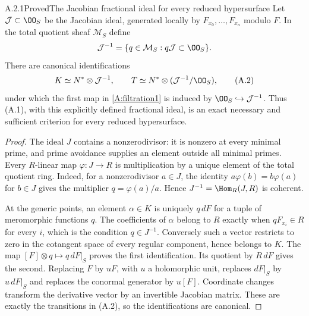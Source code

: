 \begin{statement}{A.2.1}{Proved}{The Jacobian fractional ideal for every reduced hypersurface}
Let $\mathcal J\subset\OO_S$ be the Jacobian ideal, generated locally by $F_{x_0},\ldots,F_{x_n}$ modulo $F$. In the total quotient sheaf $\mathcal M_S$ define
\[
 \mathcal J^{-1}=\{q\in\mathcal M_S:q\mathcal J\subset\OO_S\}.
\]
There are canonical identifications
\[
 K\simeq N^*\otimes\mathcal J^{-1},\qquad
 T\simeq N^*\otimes(\mathcal J^{-1}/\OO_S),
\tag{A.2}
\]
under which the first map in \eqref{A:filtration1} is induced by $\OO_S\hookrightarrow\mathcal J^{-1}$. Thus (A.1), with this explicitly defined fractional ideal, is an exact necessary and sufficient criterion for every reduced hypersurface.
\end{statement}
\begin{proof}
The ideal $J$ contains a nonzerodivisor: it is nonzero at every minimal prime, and prime avoidance supplies an element outside all minimal primes. Every $R$-linear map $\varphi:J\to R$ is multiplication by a unique element of the total quotient ring. Indeed, for a nonzerodivisor $a\in J$, the identity $a\varphi(b)=b\varphi(a)$ for $b\in J$ gives the multiplier $q=\varphi(a)/a$. Hence $J^{-1}=\Hom_R(J,R)$ is coherent.

At the generic points, an element $\alpha\in K$ is uniquely $q\,dF$ for a tuple of meromorphic functions $q$. The coefficients of $\alpha$ belong to $R$ exactly when $qF_{x_i}\in R$ for every $i$, which is the condition $q\in J^{-1}$. Conversely such a vector restricts to zero in the cotangent space of every regular component, hence belongs to $K$. The map $[F]\otimes q\mapsto q\,dF|_S$ proves the first identification. Its quotient by $R\,dF$ gives the second. Replacing $F$ by $uF$, with $u$ a holomorphic unit, replaces $dF|_S$ by $u\,dF|_S$ and replaces the conormal generator by $u[F]$. Coordinate changes transform the derivative vector by an invertible Jacobian matrix. These are exactly the transitions in (A.2), so the identifications are canonical.
\end{proof}


